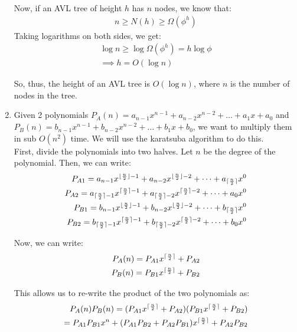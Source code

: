 \documentclass[a4paper]{article}
\DeclarePairedDelimiter{\ceil}{\lceil}{\rceil}
\DeclarePairedDelimiter{\floor}{\lfloor}{\rfloor}
\begin{document}
\begin{enumerate}
    Now, if an AVL tree of height $h$ has $n$ nodes, we know that:
    \begin{align*}
        n \geq N(h) \geq \Omega(\phi^h)
    \end{align*}
    Taking logarithms on both sides, we get:
    \begin{align*}
        \log n \geq \log \Omega(\phi^h) = h \log \phi\\
        \implies h = O(\log n)
    \end{align*}
    
    So, thus, the height of an AVL tree is $O(\log n)$, where $n$ is the number of nodes in the tree.

    \newpage
    \item Given 2 polynomials $P_A(n) = a_{n-1}x^{n-1} + a_{n-2}x^{n-2} + \dots + a_1x + a_0$ and $P_B(n) = b_{n-1}x^{n-1} + b_{n-2}x^{n-2} + \dots + b_1x + b_0$, we want to multiply them in sub $O(n^2)$ time. We will use the karatsuba algorithm to do this.\\
    
    First, divide the polynomials into two halves. Let $n$ be the degree of the polynomial. Then, we can write:
    \begin{align*}
        P_{A1} = a_{n-1}x^{\floor{\frac{n}{2}}-1} + a_{n-2}x^{\floor{\frac{n}{2}}-2} + \dots + a_{\ceil{\frac{n}{2}}}x^0\\
        P_{A2} = a_{\ceil{\frac{n}{2}}-1}x^{\ceil{\frac{n}{2}}-1} + a_{\ceil{\frac{n}{2}}-2}x^{\ceil{\frac{n}{2}}-2} + \dots + a_0x^0\\
        P_{B1} = b_{n-1}x^{\floor{\frac{n}{2}}-1} + b_{n-2}x^{\floor{\frac{n}{2}}-2} + \dots + b_{\ceil{\frac{n}{2}}}x^0\\
        P_{B2} = b_{\ceil{\frac{n}{2}}-1}x^{\ceil{\frac{n}{2}}-1} + b_{\ceil{\frac{n}{2}}-2}x^{\ceil{\frac{n}{2}}-2} + \dots + b_0x^0
    \end{align*}
    
    Now, we can write:
    \begin{align*}
        P_A(n) = P_{A1}x^{\ceil{\frac{n}{2}}} + P_{A2}\\
        P_B(n) = P_{B1}x^{\ceil{\frac{n}{2}}} + P_{B2}
    \end{align*}

    This allows us to re-write the product of the two polynomials as:
    \begin{align*}
        P_A(n)P_B(n) = (P_{A1}x^{\ceil{\frac{n}{2}}} + P_{A2})(P_{B1}x^{\ceil{\frac{n}{2}}} + P_{B2})\\
        = P_{A1}P_{B1}x^n + (P_{A1}P_{B2} + P_{A2}P_{B1})x^{\ceil{\frac{n}{2}}} + P_{A2}P_{B2}
    \end{align*}
    


\end{enumerate}
\end{document}
